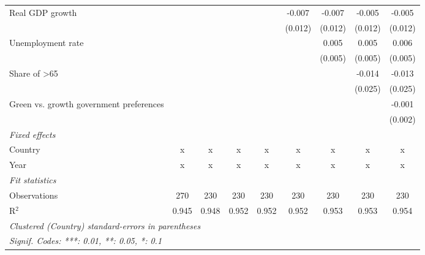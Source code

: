 \begin{table}[htbp]
\begin{tabular}{lcccccccc}
      Real GDP growth                                                 &         &         &               &               & -0.007        & -0.007        & -0.005         & -0.005\\   
                                                                      &         &         &               &               & (0.012)       & (0.012)       & (0.012)        & (0.012)\\   
      Unemployment rate                                               &         &         &               &               &               & 0.005         & 0.005          & 0.006\\   
                                                                      &         &         &               &               &               & (0.005)       & (0.005)        & (0.005)\\   
      Share of >65                                                    &         &         &               &               &               &               & -0.014         & -0.013\\   
                                                                      &         &         &               &               &               &               & (0.025)        & (0.025)\\   
      Green vs. growth government preferences                         &         &         &               &               &               &               &                & -0.001\\   
                                                                      &         &         &               &               &               &               &                & (0.002)\\   
      \emph{Fixed effects}\\
      Country                                                         & x       & x       & x             & x             & x             & x             & x              & x\\  
      Year                                                            & x       & x       & x             & x             & x             & x             & x              & x\\  
      \midrule \emph{Fit statistics}\\
      Observations                                                    & 270     & 230     & 230           & 230           & 230           & 230           & 230            & 230\\  
      R$^2$                                                           & 0.945   & 0.948   & 0.952         & 0.952         & 0.952         & 0.953         & 0.953          & 0.954\\  
      \midrule
      \multicolumn{9}{l}{\emph{Clustered (Country) standard-errors in parentheses}}\\
      \multicolumn{9}{l}{\emph{Signif. Codes: ***: 0.01, **: 0.05, *: 0.1}}\\
   \end{tabular}
\end{table}


